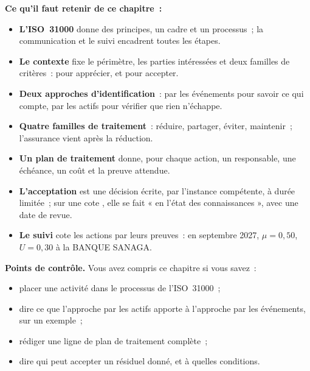 \separateur

\begin{boxresume}
\textbf{Ce qu'il faut retenir de ce chapitre~:}
\begin{itemize}
    \item \textbf{L'ISO~31000} donne des principes, un cadre et un
          processus~; la communication et le suivi encadrent toutes les
          étapes.
    \item \textbf{Le contexte} fixe le périmètre, les parties intéressées
          et deux familles de critères~: pour apprécier, et pour accepter.
    \item \textbf{Deux approches d'identification}~: par les événements
          pour savoir ce qui compte, par les actifs pour vérifier que rien
          n'échappe.
    \item \textbf{Quatre familles de traitement}~: réduire, partager,
          éviter, maintenir~; l'assurance vient après la réduction.
    \item \textbf{Un plan de traitement} donne, pour chaque action, un
          responsable, une échéance, un coût et la preuve attendue.
    \item \textbf{L'acceptation} est une décision écrite, par l'instance
          compétente, à durée limitée~; sur une cote \NEK{}, elle se fait
          « en l'état des connaissances », avec une date de revue.
    \item \textbf{Le suivi} cote les actions par leurs preuves~: en
          septembre 2027, $\mu = 0{,}50$, $U = 0{,}30$ à la BANQUE SANAGA.
\end{itemize}
\end{boxresume}

\begin{boxinfo}
\textbf{Points de contrôle.} Vous avez compris ce chapitre si vous savez~:
\begin{itemize}
    \item placer une activité dans le processus de l'ISO~31000~;
    \item dire ce que l'approche par les actifs apporte à l'approche par les
          événements, sur un exemple~;
    \item rédiger une ligne de plan de traitement complète~;
    \item dire qui peut accepter un résiduel donné, et à quelles
          conditions.
\end{itemize}
\end{boxinfo}

